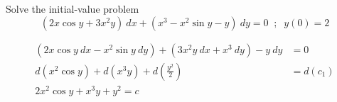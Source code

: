 \begin{example}{Solve the initial-value problem \[
        (2x\cos y + 3x^2y) \: d{x} + (x^3 - x^2\sin y - y) \: d{y} = 0 \;\;;\;\; y(0) = 2
\]}

    \begin{align*}
        (2x\cos y \: dx - x^2\sin y \: d{y}) + (3x^2y \: d{x} + x^3 \: d{y}) - y \: d{y} &= 0 \\
        d(x^2 \cos y) + d(x^3y) + d(\frac{y^2}{2}) &= d(c_1) \\
        \boxed{ 2x^2 \cos y + x^3y + y^2 = c }
    \end{align*}
\end{example}











